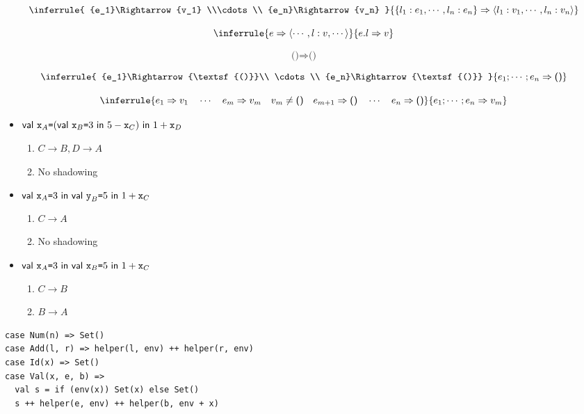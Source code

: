 \textbf{}
\[
  \inferrule
  { {e_1}\Rightarrow{v_1} \\\cdots\\ {e_n}\Rightarrow{v_n} }
  { {\{l_1:e_1,\cdots,l_n:e_n\}}\Rightarrow{\langle l_1:v_1,\cdots,l_n:v_n\rangle} }
\]

\[
  \inferrule
  { {e}\Rightarrow{\langle\cdots,l:v,\cdots\rangle} }
  { {e.l}\Rightarrow{v} }
\]

\textbf{}
\[
  {\textsf{()}}\Rightarrow{\textsf{()}}
\]

\[
  \inferrule
  { {e_1}\Rightarrow{\textsf{()}}\\ \cdots\\ {e_n}\Rightarrow{\textsf{()}} }
  { {e_1;\cdots;e_n}\Rightarrow{\textsf{()}} }
\]

\[
  \inferrule
  {
    {e_1}\Rightarrow{v_1}\quad\cdots\quad{e_m}\Rightarrow{v_m}\quad
    v_m\not=\textsf{()}\quad
    {e_{m+1}}\Rightarrow{\textsf{()}}\quad\cdots\quad{e_n}\Rightarrow{\textsf{()}}
  }
  { {e_1;\cdots;e_n}\Rightarrow{v_m} }
\]

\textbf{}

\begin{itemize}
  \item $\textsf{val}\ \texttt{x}_A\texttt{=}(\textsf{val}\ \texttt{x}_B\texttt{=}3\ \textsf{in}\ 5-\texttt{x}_C)\ \textsf{in}\ 1+\texttt{x}_D$
  \begin{enumerate}
    \item $C\rightarrow B,D\rightarrow A$
    \item No shadowing
  \end{enumerate}
  \item $\textsf{val}\ \texttt{x}_A\texttt{=}3\ \textsf{in}\ \textsf{val}\ \texttt{y}_B\texttt{=}5\ \textsf{in}\ 1+\texttt{x}_C$
  \begin{enumerate}
    \item $C\rightarrow A$
    \item No shadowing
  \end{enumerate}
  \item $\textsf{val}\ \texttt{x}_A\texttt{=}3\ \textsf{in}\ \textsf{val}\ \texttt{x}_B\texttt{=}5\ \textsf{in}\ 1+\texttt{x}_C$
  \begin{enumerate}
    \item $C\rightarrow B$
    \item $B\rightarrow A$
  \end{enumerate}
\end{itemize}

\textbf{}
\vspace{-1em}
\begin{verbatim}
case Num(n) => Set()
case Add(l, r) => helper(l, env) ++ helper(r, env)
case Id(x) => Set()
case Val(x, e, b) =>
  val s = if (env(x)) Set(x) else Set()
  s ++ helper(e, env) ++ helper(b, env + x)
\end{verbatim}

